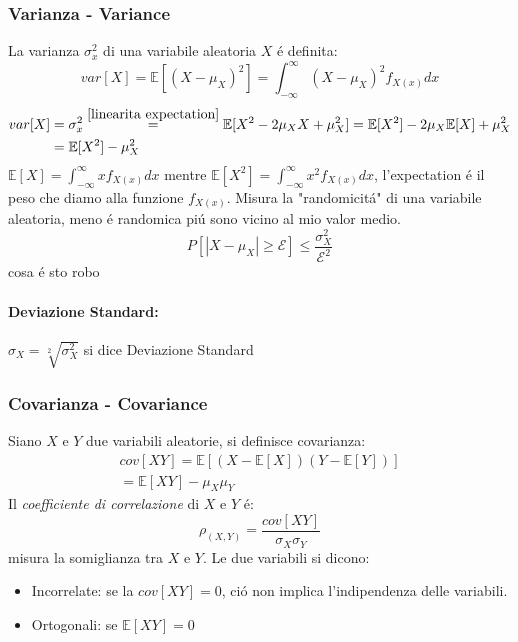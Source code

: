         \subsubsection{Varianza - Variance}
            La varianza $\sigma^2_x$ di una variabile aleatoria $X$ é definita:
            \[
                var[X] = \mathbb{E}[(X-\mu_X)^2] = \int_{-\infty}^{\infty} (X-\mu_X)^2f_{X(x)}dx
            \]  
            \begin{align}
                var[X] &= \sigma^2_x \overset{\ref{linearita expectation}}{=} \mathbb{E}[X^2-2\mu_XX+\mu_X^2] = \mathbb{E}[X^2]-2\mu_X\mathbb{E}[X]+\mu_X^2 \nonumber \\
                           &= \mathbb{E}[X^2]-\mu_X^2 \nonumber 
            \end{align}
            $\mathbb{E}[X] = \int_{-\infty}^{\infty} xf_{X(x)}dx$ mentre $\mathbb{E}[X^2] = \int_{-\infty}^{\infty} x^2f_{X(x)}dx$, l'expectation é il peso che diamo alla funzione $f_{X(x)}$.  
            Misura la "randomicitá" di una variabile aleatoria, meno é randomica piú sono vicino al mio valor medio.
            \[
                P[|X-\mu_X|\geq \mathcal{E}]\leq \frac{\sigma^2_X}{\mathcal{E}^2}
            \]
            cosa é sto robo
            \paragraph{Deviazione Standard:} $\sigma_X = \sqrt[2]{\sigma^2_X}$ si dice Deviazione Standard
        \subsubsection{Covarianza - Covariance}
            Siano $X$ e $Y$ due variabili aleatorie, si definisce covarianza:
            \begin{gather}
                cov[XY] = \mathbb{E}[(X-\mathbb{E}[X])(Y-\mathbb{E}[Y])]\nonumber\\
                = \mathbb{E}[XY]-\mu_X\mu_Y\nonumber
            \end{gather}
            Il \emph{coefficiente di correlazione} di $X$ e $Y$ é:
            \[
                \rho_{(X,Y)} = \frac{cov[XY]}{\sigma_X\sigma_Y}
            \]
            misura la somiglianza tra $X$ e $Y$. Le due variabili si dicono:
            \begin{itemize}
                \item {
                    Incorrelate: se la $cov[XY] =0$, ció non implica l'indipendenza delle variabili.
                }
                \item {
                    Ortogonali: se $\mathbb{E}[XY] = 0$
                }
            \end{itemize}
